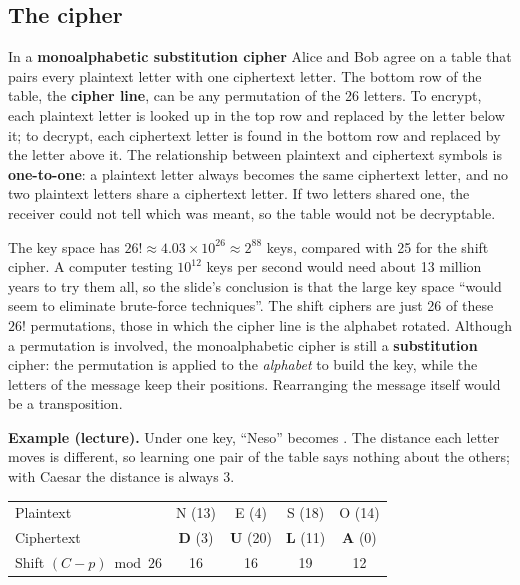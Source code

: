 \subsection{The cipher}
In a \textbf{monoalphabetic substitution cipher} Alice and Bob agree on a table that pairs every plaintext letter with one ciphertext letter. The bottom row of the table, the \textbf{cipher line}, can be any permutation of the 26 letters. To encrypt, each plaintext letter is looked up in the top row and replaced by the letter below it; to decrypt, each ciphertext letter is found in the bottom row and replaced by the letter above it. The relationship between plaintext and ciphertext symbols is \textbf{one-to-one}: a plaintext letter always becomes the same ciphertext letter, and no two plaintext letters share a ciphertext letter. If two letters shared one, the receiver could not tell which was meant, so the table would not be decryptable.

The key space has $26! \approx 4.03 \times 10^{26} \approx 2^{88}$ keys, compared with 25 for the shift cipher. A computer testing $10^{12}$ keys per second would need about 13 million years to try them all, so the slide's conclusion is that the large key space ``would seem to eliminate brute-force techniques''. The shift ciphers are just 26 of these $26!$ permutations, those in which the cipher line is the alphabet rotated. Although a permutation is involved, the monoalphabetic cipher is still a \textbf{substitution} cipher: the permutation is applied to the \emph{alphabet} to build the key, while the letters of the message keep their positions. Rearranging the message itself would be a transposition.

\textbf{Example (lecture).} Under one key, ``Neso'' becomes . The distance each letter moves is different, so learning one pair of the table says nothing about the others; with Caesar the distance is always 3.
\begin{center}\small\setlength{\tabcolsep}{6pt}
\begin{tabular}{@{}lcccc@{}}
\toprule
Plaintext & N (13) & E (4) & S (18) & O (14)\\
Ciphertext & \textbf{D} (3) & \textbf{U} (20) & \textbf{L} (11) & \textbf{A} (0)\\
Shift $(C-p) \bmod 26$ & 16 & 16 & 19 & 12\\
\bottomrule
\end{tabular}
\end{center}

